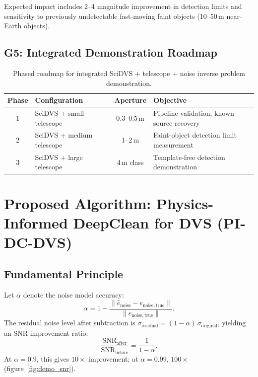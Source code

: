 \documentclass[12pt]{article}
\begin{document}
Expected impact includes 2--4 magnitude improvement in detection limits and sensitivity to previously undetectable fast-moving faint objects (10--50\,m near-Earth objects).

\subsection{G5: Integrated Demonstration Roadmap}

\begin{table}[htbp]
\centering
\caption{Phased roadmap for integrated SciDVS + telescope + noise inverse problem demonstration.}
\label{tab:roadmap}
\begin{tabular}{@{}clcl@{}}
\toprule
Phase & Configuration & Aperture & Objective \\
\midrule
1 & SciDVS + small telescope & 0.3--0.5\,m & Pipeline validation, known-source recovery \\
2 & SciDVS + medium telescope & 1--2\,m & Faint-object detection limit measurement \\
3 & SciDVS + large telescope & 4\,m class & Template-free detection demonstration \\
\bottomrule
\end{tabular}
\end{table}


\section{Proposed Algorithm: Physics-Informed DeepClean for DVS (PI-DC-DVS)}
\label{sec:algorithm}

\subsection{Fundamental Principle}

Let $\alpha$ denote the noise model accuracy:
\begin{equation}
  \alpha = 1 - \frac{\|\hat{e}_\mathrm{noise} - e_\mathrm{noise,true}\|}{\|e_\mathrm{noise,true}\|}.
  \label{eq:alpha}
\end{equation}
The residual noise level after subtraction is $\sigma_\mathrm{residual} = (1-\alpha)\,\sigma_\mathrm{original}$, yielding an SNR improvement ratio:
\begin{equation}
  \frac{\mathrm{SNR}_\mathrm{after}}{\mathrm{SNR}_\mathrm{before}} = \frac{1}{1-\alpha}.
  \label{eq:snr}
\end{equation}
At $\alpha=0.9$, this gives $10\times$ improvement; at $\alpha=0.99$, $100\times$ (figure~\ref{fig:demo_snr}).
\end{document}
